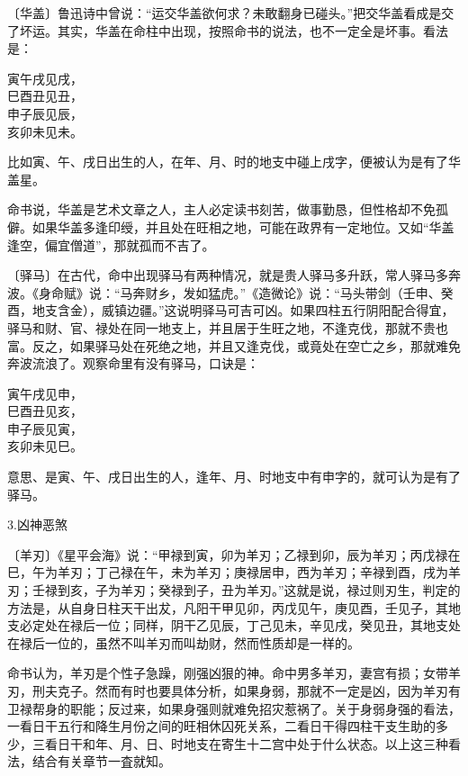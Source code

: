 \documentclass[a5paper,oneside,12pt]{ctexbook}
\newenvironment{tightcenter}{%
  \setlength\topsep{0pt}
  \setlength\parskip{0pt}
  \begin{center}\kaishu 
}{%
  \end{center}
}
\begin{document}
〔华盖〕鲁迅诗中曾说：“运交华盖欲何求？未敢翻身已碰头。”把交华盖看成是交了坏运。其实，华盖在命柱中出现，按照命书的说法，也不一定全是坏事。看法是：
\begin{tightcenter}
寅午戌见戌，\\
巳酉丑见丑，\\
申子辰见辰，\\
亥卯未见未。\\
\end{tightcenter}
比如寅、午、戌日出生的人，在年、月、时的地支中碰上戌字，便被认为是有了华盖星。

命书说，华盖是艺术文章之人，主人必定读书刻苦，做事勤恳，但性格却不免孤僻。如果华盖多逢印绶，并且处在旺相之地，可能在政界有一定地位。又如“华盖逢空，偏宜僧道”，那就孤而不吉了。

〔驿马〕在古代，命中出现驿马有两种情况，就是贵人驿马多升跃，常人驿马多奔波。《身命赋》说：“马奔财乡，发如猛虎。”《造微论》说：“马头带剑（壬申、癸酉，地支含金），威镇边疆。”这说明驿马可吉可凶。如果四柱五行阴阳配合得宜，驿马和财、官、禄处在同一地支上，并且居于生旺之地，不逢克伐，那就不贵也富。反之，如果驿马处在死绝之地，并且又逢克伐，或竟处在空亡之乡，那就难免奔波流浪了。观察命里有没有驿马，口诀是：
\begin{tightcenter}
寅午戌见申，\\
巳酉丑见亥，\\
申子辰见寅，\\
亥卯未见巳。\\
\end{tightcenter}
意思、是寅、午、戌日出生的人，逢年、月、时地支中有申字的，就可认为是有了驿马。

3.凶神恶煞

〔羊刃〕《星平会海》说：“甲禄到寅，卯为羊刃；乙禄到卯，辰为羊刃；丙戊禄在巳，午为羊刃；丁己禄在午，未为羊刃；庚禄居申，西为羊刃；辛禄到酉，戌为羊刃；壬禄到亥，子为羊刃；癸禄到子，丑为羊刃。”这就是说，禄过则刃生，判定的方法是，从自身日柱天干出犮，凡阳干甲见卯，丙戊见午，庚见酉，壬见子，其地支必定处在禄后一位；同样，阴干乙见辰，丁己见未，辛见戌，癸见丑，其地支处在禄后一位的，虽然不叫羊刃而叫劫财，然而性质却是一样的。

命书认为，羊刃是个性子急躁，刚强凶狠的神。命中男多羊刃，妻宫有损；女带羊刃，刑夫克子。然而有时也要具体分析，如果身弱，那就不一定是凶，因为羊刃有卫禄帮身的职能；反过来，如果身强则就难免招灾惹祸了。关于身弱身强的看法，一看日干五行和降生月份之间的旺相休囚死关系，二看日干得四柱干支生助的多少，三看日干和年、月、日、时地支在寄生十二宫中处于什么状态。以上这三种看法，结合有关章节一査就知。
\end{document}

